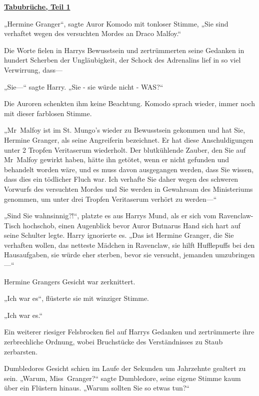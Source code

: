 

\hypertarget{tabubruxfcche-teil-1}{%

\textbf{\uline{Tabubrüche, Teil 1}}

„Hermine Granger“, sagte Auror Komodo mit tonloser Stimme, „Sie sind verhaftet wegen des versuchten Mordes an Draco Malfoy.“

Die Worte fielen in Harrys Bewusstsein und zertrümmerten seine Gedanken in hundert Scherben der Ungläubigkeit, der Schock des Adrenalins lief in so viel Verwirrung, dass—

„Sie—“ sagte Harry. „Sie - sie würde nicht - WAS?“

Die Auroren schenkten ihm keine Beachtung. Komodo sprach wieder, immer noch mit dieser farblosen Stimme.

„Mr~Malfoy ist im St. Mungo's wieder zu Bewusstsein gekommen und hat Sie, Hermine Granger, als seine Angreiferin bezeichnet. Er hat diese Anschuldigungen unter 2 Tropfen Veritaserum wiederholt. Der blutkühlende Zauber, den Sie auf Mr~Malfoy gewirkt haben, hätte ihn getötet, wenn er nicht gefunden und behandelt worden wäre, und es muss davon ausgegangen werden, dass Sie wissen, dass dies ein tödlicher Fluch war. Ich verhafte Sie daher wegen des schweren Vorwurfs des versuchten Mordes und Sie werden in Gewahrsam des Ministeriums genommen, um unter drei Tropfen Veritaserum verhört zu werden—“

„Sind Sie wahnsinnig?!“, platzte es aus Harrys Mund, als er sich vom Ravenclaw-Tisch hochschob, einen Augenblick bevor Auror Butnarus Hand sich hart auf seine Schulter legte. Harry ignorierte es. „Das ist Hermine Granger, die Sie verhaften wollen, das netteste Mädchen in Ravenclaw, sie hilft Hufflepuffs bei den Hausaufgaben, sie würde eher sterben, bevor sie versucht, jemanden umzubringen—“

Hermine Grangers Gesicht war zerknittert.

„Ich war es“, flüsterte sie mit winziger Stimme.

„Ich war es.“

Ein weiterer riesiger Felsbrocken fiel auf Harrys Gedanken und zertrümmerte ihre zerbrechliche Ordnung, wobei Bruchstücke des Verständnisses zu Staub zerbarsten.

Dumbledores Gesicht schien im Laufe der Sekunden um Jahrzehnte gealtert zu sein. „Warum, Miss~Granger?“ sagte Dumbledore, seine eigene Stimme kaum über ein Flüstern hinaus. „Warum sollten Sie so etwas tun?“

}
